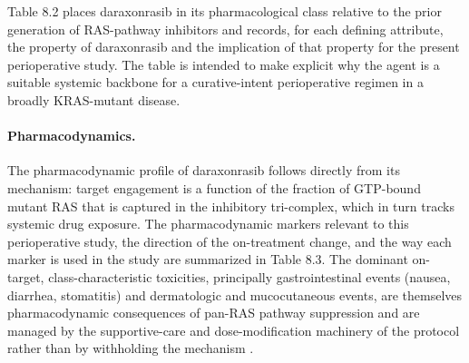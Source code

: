 Table 8.2 places daraxonrasib in its pharmacological class relative to the prior
generation of RAS-pathway inhibitors and records, for each defining attribute,
the property of daraxonrasib and the implication of that property for the present
perioperative study. The table is intended to make explicit why the agent is a
suitable systemic backbone for a curative-intent perioperative regimen in a
broadly KRAS-mutant disease.

\paragraph{Pharmacodynamics.}
The pharmacodynamic profile of daraxonrasib follows directly from its mechanism:
target engagement is a function of the fraction of GTP-bound mutant RAS that is
captured in the inhibitory tri-complex, which in turn tracks systemic drug
exposure. The pharmacodynamic markers relevant to this perioperative study, the
direction of the on-treatment change, and the way each marker is used in the
study are summarized in Table 8.3. The dominant on-target, class-characteristic
toxicities, principally gastrointestinal events (nausea, diarrhea, stomatitis)
and dermatologic and mucocutaneous events, are themselves pharmacodynamic
consequences of pan-RAS pathway suppression and are managed by the supportive-care
and dose-modification machinery of the protocol rather than by withholding the
mechanism \cite{onpremwhippl}.

\clearpage

